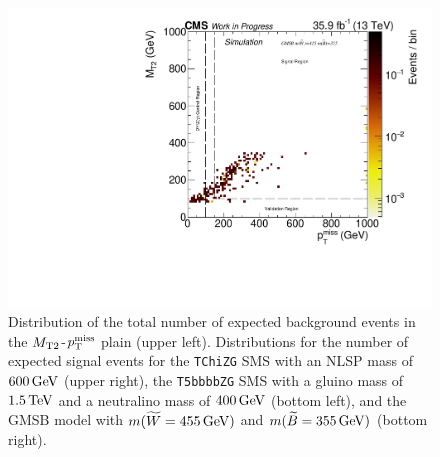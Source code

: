 \begin{figure}[tbp]
 \includegraphics[width=\pairwidth]{figures/plots_2d/DataMC_sameHistograms_LL+signal_onZ__LL__MetMt2_SIG_gmsb_415_355_}
 \caption{Distribution of the total number of expected background events in the $M_{\mathrm{T2}}$-$p_{\mathrm{T}}^\text{miss}$ plain (upper left). Distributions for the number of expected signal events for the \texttt{TChiZG} SMS with an NLSP mass of $600\,\text{Ge\hspace{-.08em}V}$ (upper right), the \texttt{T5bbbbZG} SMS with a gluino mass of $1.5\,\text{Te\hspace{-.08em}V}$ and a neutralino mass of $400\,\text{Ge\hspace{-.08em}V}$ (bottom left), and the GMSB model with $m(\widetilde{W}=455\,\text{Ge\hspace{-.08em}V})$ and $m(\widetilde{B}=355\,\text{Ge\hspace{-.08em}V})$ (bottom right).}
 \label{fig:Regions2}
\end{figure}



